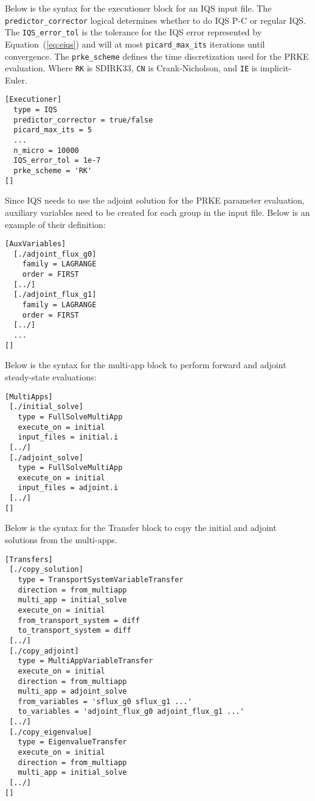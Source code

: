 \documentclass[12pt]{scrartcl}
\newcommand{\eqt}[1]{Equation~(\ref{#1})}                     %
\begin{document}
Below is the syntax for the executioner block for an IQS input file.  The \texttt{predictor\_corrector} logical determines whether to do IQS P-C or regular IQS.  The \texttt{IQS\_error\_tol} is the tolerance for the IQS error represented by \eqt{eq:eiqs} and will at most \texttt{picard\_max\_its} iterations until convergence.  The \texttt{prke\_scheme} defines the time discretization used for the PRKE evaluation. Where \texttt{RK} is SDIRK33, \texttt{CN} is Crank-Nicholson, and \texttt{IE} is implicit-Euler.
\begin{lstlisting}
[Executioner]
  type = IQS
  predictor_corrector = true/false
  picard_max_its = 5
  ...
  n_micro = 10000
  IQS_error_tol = 1e-7
  prke_scheme = 'RK'
[]
\end{lstlisting}

Since IQS needs to use the adjoint solution for the PRKE parameter evaluation, auxiliary variables need to be created for each group in the input file.  Below is an example of their definition:
\begin{lstlisting}
[AuxVariables]
  [./adjoint_flux_g0]
    family = LAGRANGE
    order = FIRST
  [../]
  [./adjoint_flux_g1]
    family = LAGRANGE
    order = FIRST
  [../]
  ...
[]
\end{lstlisting}

Below is the syntax for the multi-app block to perform forward and adjoint steady-state evaluations:
\begin{lstlisting}
[MultiApps]
 [./initial_solve]
   type = FullSolveMultiApp
   execute_on = initial
   input_files = initial.i
 [../]
 [./adjoint_solve]
   type = FullSolveMultiApp
   execute_on = initial
   input_files = adjoint.i
 [../]
[]
\end{lstlisting}

Below is the syntax for the Transfer block to copy the initial and adjoint solutions from the multi-apps.
\begin{lstlisting}
[Transfers]
 [./copy_solution]
   type = TransportSystemVariableTransfer
   direction = from_multiapp
   multi_app = initial_solve
   execute_on = initial
   from_transport_system = diff
   to_transport_system = diff
 [../]
 [./copy_adjoint]
   type = MultiAppVariableTransfer
   execute_on = initial
   direction = from_multiapp
   multi_app = adjoint_solve
   from_variables = 'sflux_g0 sflux_g1 ...'
   to_variables = 'adjoint_flux_g0 adjoint_flux_g1 ...'
 [../]
 [./copy_eigenvalue]
   type = EigenvalueTransfer
   execute_on = initial
   direction = from_multiapp
   multi_app = initial_solve
 [../]
[]
\end{lstlisting}
\end{document}
